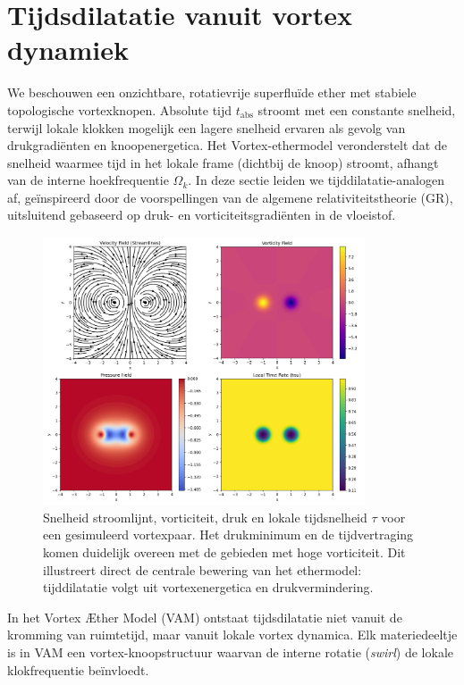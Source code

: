 \section{Tijdsdilatatie vanuit vortex dynamiek}

We beschouwen een onzichtbare, rotatievrije superfluïde ether met stabiele topologische vortexknopen. Absolute tijd $t_{\text{abs}}$ stroomt met een constante snelheid, terwijl lokale klokken mogelijk een lagere snelheid ervaren als gevolg van drukgradiënten en knoopenergetica. Het Vortex-ethermodel veronderstelt dat de snelheid waarmee tijd in het lokale frame (dichtbij de knoop) stroomt, afhangt van de interne hoekfrequentie $\Omega_k$. In deze sectie leiden we tijddilatatie-analogen af, geïnspireerd door de voorspellingen van de algemene relativiteitstheorie (GR), uitsluitend gebaseerd op druk- en vorticiteitsgradiënten in de vloeistof.

\begin{figure}[htbp]
\centering
\includegraphics[width=0.85\textwidth]{streamlinesDiPole}
\caption{Snelheid stroomlijnt, vorticiteit, druk en lokale tijdsnelheid $\tau$ voor een gesimuleerd vortexpaar. Het drukminimum en de tijdvertraging komen duidelijk overeen met de gebieden met hoge vorticiteit. Dit illustreert direct de centrale bewering van het ethermodel: tijddilatatie volgt uit vortexenergetica en drukvermindering.}
\label{fig:vortexfields}
\end{figure}

In het Vortex Æther Model (VAM) ontstaat tijdsdilatatie niet vanuit de kromming van ruimtetijd, maar vanuit lokale vortex dynamica. Elk materiedeeltje is in VAM een vortex-knoopstructuur waarvan de interne rotatie (\textit{swirl}) de lokale klokfrequentie beïnvloedt.

